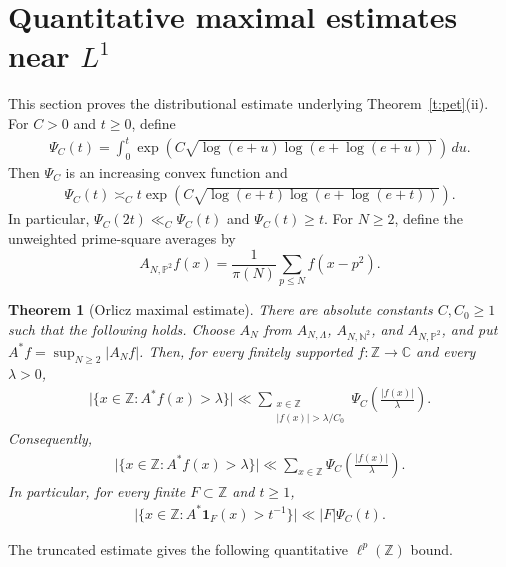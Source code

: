 \documentclass[12pt,reqno]{amsart}
\numberwithin{equation}{section}
\newtheorem{theorem}[equation]{Theorem}
\theoremstyle{definition}
\theoremstyle{remark}
\begin{document}
\section{Quantitative maximal estimates near \(L^1\)}
\label{s:orlicz}

This section proves the distributional estimate underlying
Theorem~\ref{t:pet}\textup{(ii)}.
For \(C>0\) and \(t\geq0\), define
\begin{align}\label{e:orlicz-gauge}
 \Psi_C(t)
 =
 \int_0^t
 \exp\left(
 C\sqrt{\log(e+u)\log(e+\log(e+u))}
 \right)\,du.
\end{align}
Then \(\Psi_C\) is an increasing convex function and
\begin{align}\label{e:orlicz-gauge-comparison}
 \Psi_C(t)
 \asymp_C
 t\exp\left(
 C\sqrt{\log(e+t)\log(e+\log(e+t))}
 \right).
\end{align}
In particular, \(\Psi_C(2t)\ll_C\Psi_C(t)\) and
\(\Psi_C(t)\geq t\).
For \(N\geq2\), define the unweighted prime-square averages by
\[
 A_{N,\mathbb P^2}f(x)
 =
 \frac1{\pi(N)}
 \sum_{p\leq N}f(x-p^2).
\]

\begin{theorem}[Orlicz maximal estimate]
\label{t:orlicz-maximal}
 There are absolute constants \(C,C_0\geq1\) such that the
following holds. Choose \(A_N\) from \(A_{N,\Lambda}\),
\(A_{N,\mathbb N^2}\), and \(A_{N,\mathbb P^2}\), and put
\(A^*f=\sup_{N\geq2}|A_Nf|\).
Then, for every finitely supported \(f:\mathbb Z\to\mathbb C\) and
every \(\lambda>0\),
\begin{align}\label{e:orlicz-truncated}
 \bigl|\{x\in\mathbb Z:A^*f(x)>\lambda\}\bigr|
 \ll
 \sum_{\substack{x\in\mathbb Z\\
 |f(x)|>\lambda/C_0}}
 \Psi_C\left(\frac{|f(x)|}{\lambda}\right).
\end{align}
Consequently,
\begin{align}\label{e:orlicz-modular}
 \bigl|\{x\in\mathbb Z:A^*f(x)>\lambda\}\bigr|
 \ll
 \sum_{x\in\mathbb Z}
 \Psi_C\left(\frac{|f(x)|}{\lambda}\right).
\end{align}
In particular, for every finite \(F\subset\mathbb Z\) and \(t\geq1\),
\begin{align}\label{e:orlicz-restricted}
 \bigl|\{x\in\mathbb Z:A^*\mathbf1_F(x)>t^{-1}\}\bigr|
 \ll |F|\Psi_C(t).
\end{align}
\end{theorem}

The truncated estimate gives the following quantitative
\(\ell^p(\mathbb Z)\) bound.
\end{document}
